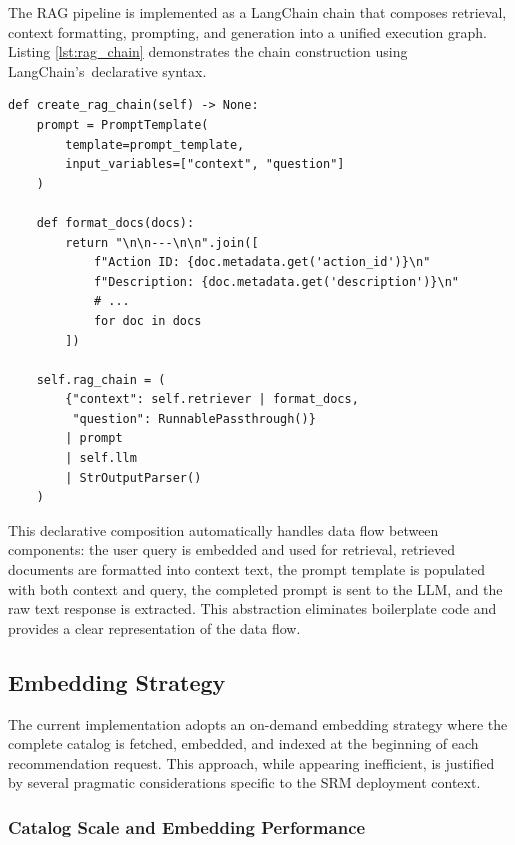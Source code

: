 The RAG pipeline is implemented as a LangChain chain that composes retrieval, context formatting, prompting, and generation into a unified execution graph. Listing \ref{lst:rag_chain} demonstrates the chain construction using LangChain's~declarative syntax.

\begin{listing}[htbp]
\begin{verbatim}
def create_rag_chain(self) -> None:
    prompt = PromptTemplate(
        template=prompt_template, 
        input_variables=["context", "question"]
    )
    
    def format_docs(docs):
        return "\n\n---\n\n".join([
            f"Action ID: {doc.metadata.get('action_id')}\n"
            f"Description: {doc.metadata.get('description')}\n"
            # ...
            for doc in docs
        ])
    
    self.rag_chain = (
        {"context": self.retriever | format_docs, 
         "question": RunnablePassthrough()}
        | prompt
        | self.llm
        | StrOutputParser()
    )
\end{verbatim}
\caption{RAG Chain Composition with LangChain}
\label{lst:rag_chain}
\end{listing}

This declarative composition automatically handles data flow between components: the user query is embedded and used for retrieval, retrieved documents are formatted into context text, the prompt template is populated with both context and query, the completed prompt is sent to the LLM, and the raw text response is extracted. This abstraction eliminates boilerplate code and provides a clear representation of the data flow.

\subsection{Embedding Strategy}

The current implementation adopts an on-demand embedding strategy where the complete catalog is fetched, embedded, and indexed at the beginning of each recommendation request. This approach, while appearing inefficient, is justified by several pragmatic considerations specific to the SRM deployment context.

\subsubsection{Catalog Scale and Embedding Performance}

